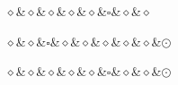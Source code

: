 \begin{exe}
{\begin{minipage}[t]{2.5\treewidth}
\begin{xlist}
\begin{multicols}{2}
\columnbreak

\ex
\begin{minipage}[b][\treeheight]{\treewidth}
\phantom{$\odot$}\hspace{\fontdimen4\font}
\begin{dependency}[theme = simple, baseline=-\the\dimexpr\fontdimen22\textfont2\relax]
    \begin{deptext}
        $\diamond$\&$\diamond$\&$\diamond$\&$\diamond$\&$\diamond$\&$\square$\&$\diamond$\&$\diamond$\\
    \end{deptext}
\end{dependency}
\end{minipage}
\end{multicols}

\begin{multicols}{2}

\ex
\begin{minipage}[b][\treeheight]{\treewidth}
\phantom{$\odot$}\hspace{\fontdimen4\font}
\begin{dependency}[theme = simple, baseline=-\the\dimexpr\fontdimen22\textfont2\relax]
    \begin{deptext}
        $\diamond$\&$\diamond$\&$\square$\&$\diamond$\&$\diamond$\&$\diamond$\&$\diamond$\&$\diamond$\&$\odot$\\
    \end{deptext}
\end{dependency}
\end{minipage}

\columnbreak

\ex
\begin{minipage}[b][\treeheight]{\treewidth}
\phantom{$\odot$}\hspace{\fontdimen4\font}
\begin{dependency}[theme = simple, baseline=-\the\dimexpr\fontdimen22\textfont2\relax]
    \begin{deptext}
        $\diamond$\&$\diamond$\&$\diamond$\&$\diamond$\&$\diamond$\&$\square$\&$\diamond$\&$\diamond$\&$\odot$\\
    \end{deptext}
\end{dependency}
\end{minipage}
\end{multicols}

\end{xlist}
\end{minipage}
}
\end{exe}

